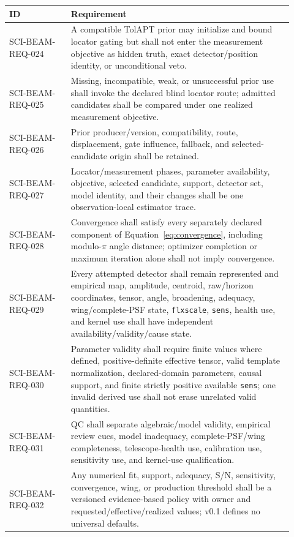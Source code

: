 \begin{longtable}{>{\raggedright\arraybackslash\ttfamily\scriptsize}p{0.20\linewidth}L{0.72\linewidth}}
\toprule ID & Requirement \\
\midrule
SCI-BEAM-REQ-024 & A compatible TolAPT prior may initialize and bound locator gating but shall not enter the measurement objective as hidden truth, exact detector/position identity, or unconditional veto. \\
SCI-BEAM-REQ-025 & Missing, incompatible, weak, or unsuccessful prior use shall invoke the declared blind locator route; admitted candidates shall be compared under one realized measurement objective. \\
SCI-BEAM-REQ-026 & Prior producer/version, compatibility, route, displacement, gate influence, fallback, and selected-candidate origin shall be retained. \\
SCI-BEAM-REQ-027 & Locator/measurement phases, parameter availability, objective, selected candidate, support, detector set, model identity, and their changes shall be one observation-local estimator trace. \\
SCI-BEAM-REQ-028 & Convergence shall satisfy every separately declared component of Equation~\ref{eq:convergence}, including modulo-$\pi$ angle distance; optimizer completion or maximum iteration alone shall not imply convergence. \\
SCI-BEAM-REQ-029 & Every attempted detector shall remain represented and empirical map, amplitude, centroid, raw/horizon coordinates, tensor, angle, broadening, adequacy, wing/complete-PSF state, \texttt{flxscale}, \texttt{sens}, health use, and kernel use shall have independent availability/validity/cause state. \\
SCI-BEAM-REQ-030 & Parameter validity shall require finite values where defined, positive-definite effective tensor, valid template normalization, declared-domain parameters, causal support, and finite strictly positive available \texttt{sens}; one invalid derived use shall not erase unrelated valid quantities. \\
SCI-BEAM-REQ-031 & QC shall separate algebraic/model validity, empirical review cues, model inadequacy, complete-PSF/wing completeness, telescope-health use, calibration use, sensitivity use, and kernel-use qualification. \\
SCI-BEAM-REQ-032 & Any numerical fit, support, adequacy, S/N, sensitivity, convergence, wing, or production threshold shall be a versioned evidence-based policy with owner and requested/effective/realized values; v0.1 defines no universal defaults. \\

\end{longtable}
